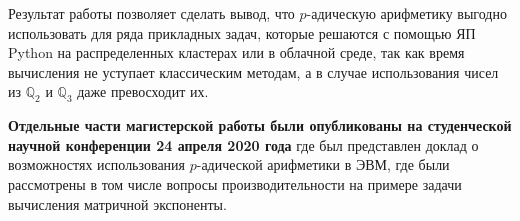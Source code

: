 \documentclass[master, och, autoref, times]{sty/SCWorks}
\theoremstyle{plain}
\theoremstyle{definition}
\numberwithin{equation}{section}
\begin{document}
Результат работы позволяет сделать вывод, что $p$-адическую арифметику выгодно использовать для ряда прикладных задач, которые решаются с помощью ЯП Python на распределенных кластерах или в облачной среде, так как время вычисления не уступает классическим методам, а в случае использования чисел из $\mathbb{Q}_2$ и $\mathbb{Q}_3$ даже превосходит их.


\textbf{Отдельные части магистерской работы были опубликованы на студенческой научной конференции 24 апреля 2020 года} где был представлен доклад о возможностях использования $p$-адической арифметики в ЭВМ, где были рассмотрены в том числе вопросы производительности на примере задачи вычисления матричной экспоненты.

\nocite{*}


\end{document}
